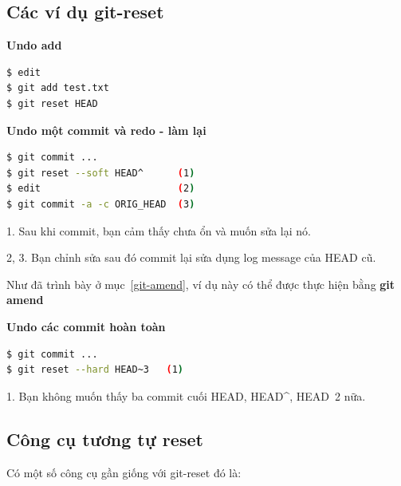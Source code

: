 \documentclass[a4paper, 11pt]{article}
\begin{document}
\subsection{Các ví dụ git-reset}

\textbf{Undo add}

\begin{lstlisting}[language=bash]
$ edit
$ git add test.txt
$ git reset HEAD
\end{lstlisting}

\textbf{Undo một commit và redo - làm lại}

\begin{lstlisting}[language=bash]
$ git commit ...
$ git reset --soft HEAD^      (1)
$ edit                        (2)
$ git commit -a -c ORIG_HEAD  (3)
\end{lstlisting}

1. Sau khi commit, bạn cảm thấy chưa ổn và muốn sửa lại nó.

2, 3. Bạn chỉnh sửa sau đó commit lại sửa dụng log message của HEAD cũ.

Như đã trình bày ở mục~\ref{git-amend}, ví dụ này có thể được thực hiện bằng \textbf{git amend} 

\textbf{Undo các commit hoàn toàn}

\begin{lstlisting}[language=bash]
$ git commit ...
$ git reset --hard HEAD~3   (1)
\end{lstlisting}

1. Bạn không muốn thấy ba commit cuối HEAD, HEAD\string^, HEAD\string~2 nữa.

\subsection{Công cụ tương tự reset}
Có một số công cụ gần giống với git-reset đó là:
\end{document}
